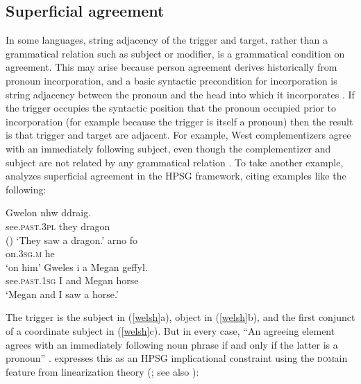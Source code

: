 \documentclass[output=paper,biblatex,babelshorthands,newtxmath,draftmode,colorlinks,citecolor=brown]{langscibook}
\begin{document}
\subsection{Superficial agreement}
\label{agreement:sec-superficial-agreement}

In some languages, string adjacency of the trigger and target, rather than a grammatical relation
such as subject or modifier, is a grammatical condition on agreement. This may arise because person
agreement derives historically from pronoun incorporation, and a basic syntactic precondition for
incorporation is string adjacency between the pronoun and the head into which it incorporates
\citep{givon:1976,ariel:1999,wechsler+epps+coppock:2010,fuss:2005}.  If the trigger occupies the
syntactic position that the pronoun occupied prior to incorporation (for example because the trigger
is itself a pronoun) then the result is that trigger and target are adjacent.  For example, West
 complementizers agree with an immediately following subject, even though the
complementizer and subject are not related by any grammatical relation \citep{Haegeman:1992}.
To take another example, \citet{Borsley:2009} analyzes  superficial agreement in the HPSG framework, citing examples like the following:

\begin{exe}
\ex \label{welsh}
\begin{xlist}
\ex
\gll 	Gwelon nhw ddraig. \\
see.\textsc{past.3pl} they dragon \\\hfill()
\glt `They saw a dragon.’
\ex 
\gll 	arno fo \\
on.\textsc{3sg.m} he \\
\glt `on him’
\ex 
\gll 	Gweles i a Megan geffyl. \\
see.\textsc{past.1sg} I and Megan horse \\
\glt `Megan and I saw a horse.’
\end{xlist}
\end{exe}

\largerpage[2]
\noindent
The trigger is the subject in (\ref{welsh}a), object in (\ref{welsh}b), and the first conjunct of a coordinate subject in (\ref{welsh}c).  But in every case, ``An agreeing element agrees with an immediately following noun phrase if and only if the latter is a pronoun'' \citep[237]{Borsley:2009}. \citet[257]{Borsley:2009} expresses this as an HPSG implicational constraint using the \textsc{dom}ain feature from linearization theory (\citealt{reape:1994,Mueller95c,Mueller99a,Kathol:2000}; see also ):
\end{document}
